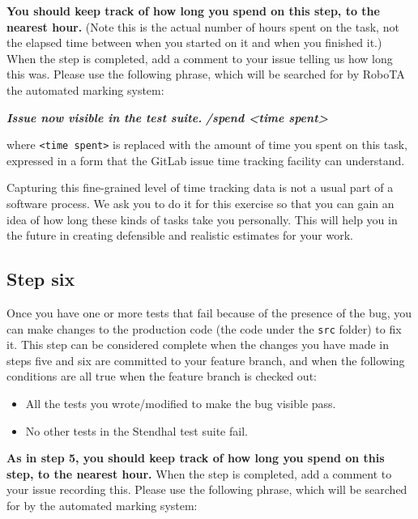 \documentclass[
]{book}
\newenvironment{Shaded}{\begin{snugshade}}{\end{snugshade}}
\newcommand{\InformationTok}[1]{\textcolor[rgb]{0.56,0.35,0.01}{\textbf{\textit{#1}}}}
\providecommand{\tightlist}{%
  \setlength{\itemsep}{0pt}\setlength{\parskip}{0pt}}
\begin{document}
\textbf{You should keep track of how long you spend on this step, to the nearest hour.} (Note this is the actual number of hours spent on the task, not the elapsed time between when you started on it and when you finished it.) When the step is completed, add a comment to your issue telling us how long this was. Please use the following phrase, which will be searched for by RoboTA 🤖 the automated marking system:

\begin{Shaded}
\begin{Highlighting}[]
\InformationTok{    Issue now visible in the test suite.}
\InformationTok{    /spend \textless{}time spent\textgreater{}}
\end{Highlighting}
\end{Shaded}

where \texttt{\textless{}time\ spent\textgreater{}} is replaced with the amount of time you spent on this task, expressed in a form that the GitLab issue time tracking facility can understand.

Capturing this fine-grained level of time tracking data is not a usual part of a software process. We ask you to do it for this exercise so that you can gain an idea of how long these kinds of tasks take you personally. This will help you in the future in creating defensible and realistic estimates for your work.

\hypertarget{stepsix}{%
\subsection{Step six}\label{stepsix}}

Once you have one or more tests that fail because of the presence of the bug, you can make changes to the production code (the code under the \texttt{src} folder) to fix it. This step can be considered complete when the changes you have made in steps five and six are committed to your feature branch, and when the following conditions are all true when the feature branch is checked out:

\begin{itemize}
\tightlist
\item
  All the tests you wrote/modified to make the bug visible pass.
\item
  No other tests in the Stendhal test suite fail.
\end{itemize}

\textbf{As in step 5, you should keep track of how long you spend on this step, to the nearest hour.} When the step is completed, add a comment to your issue recording this. Please use the following phrase, which will be searched for by the automated marking system:
\end{document}
